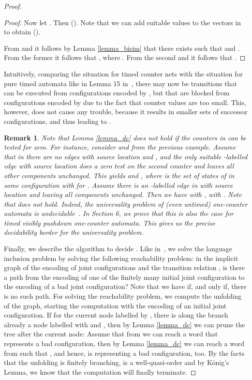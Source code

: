 \documentclass{CSML}
\theoremstyle{plain}\newtheorem{theorem}[thm]{Theorem}
\theoremstyle{plain}\newtheorem{corollary}[thm]{Corollary}
\theoremstyle{plain}\newtheorem{example}[thm]{Example}
\theoremstyle{plain}\newtheorem{lemma}[thm]{Lemma}
\theoremstyle{plain}\newtheorem{remark}[thm]{Remark}
\begin{document}
\begin{proof}
\begin{proof}
			


			
			Now let . 
			Then  (). 
			Note that we can add suitable values to the vectors in  to obtain  (). 
			
			


			
			From  and  it follows by Lemma \ref{lemma_bisim} that there exists
			 such that 
			 and 
			. 
			From the former it follows that
			, where . 
			From the second and  it follows that  .
		\end{proof}
		Intuitively, 
		comparing the situation for timed counter nets with the situation for pure timed automata like in Lemma 15 in~\cite{DBLP:conf/lics/OuaknineW04}, 
		there may now be transitions that can be executed from configurations encoded by , but that are blocked from configurations encoded by  due to the fact that counter values are too small. This, however, does not cause any trouble, because it results in smaller sets of successor configurations, and thus leading to . 
		\begin{remark}
		Note that Lemma  \ref{lemma_dc} does not hold if the counters in  can be tested for zero. 
		For instance, consider  and  from the previous example. Assume that in  there are no edges with source location  and , and the only suitable -labelled edge with source location  
		does a zero test on the second counter and leaves all other components unchanged. 
		This yields  
		 and , 
		where  is the set of states of  in some configuration  with  for .
		Assume there is an -labelled edge in  with source location  and leaving all components unchanged. 
		Then we have
		 with  , 
		 with 
		. 
		Note that  does \emph{not} hold. 		
		Indeed, the universality problem of (even untimed) one-counter automata is undecidable~\cite{DBLP:journals/jacm/Greibach69,DBLP:journals/mst/Ibarra79}. 
		In Section 6, we prove that this is also the case for timed visibly pushdown one-counter automata. 
		This gives us the precise decidability border for the universality problem. 
	\end{remark}
Finally, we describe the algorithm to decide . 
		Like in~\cite{DBLP:conf/lics/OuaknineW04}, 
		we solve the language inclusion problem by solving the following reachability problem: in the implicit graph of the encoding of joint configurations and the transition relation ,
		is there a path from the encoding of one of the finitely many  initial joint configuration to the encoding of a bad joint configuration?
		Note that we have  if, and only if, there is no such path. 
		For solving the reachability problem, we compute the unfolding of the graph, 
		starting the computation with the encoding of an initial joint configuration.
		If for the current node labelled by , there is along the branch already a node labelled with  and , 
		then by Lemma \ref{lemma_dc} we can prune the tree after the current node: 
		Assume that from  we can reach a word  that represents a bad configuration,
		then by Lemma \ref{lemma_dc} we can reach a word  from  such that , and hence,  is representing a bad configuration, too. 		
		By the facts that the unfolding is finitely branching,  is a well-quasi-order and by K\"onig's Lemma, we know that the computation will finally terminate. 
	\end{proof}
	
\end{document}
